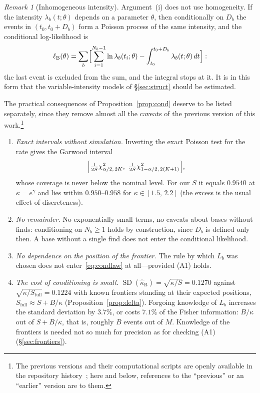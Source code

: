 \documentclass[11pt,a4paper]{article}
\theoremstyle{plain}
\theoremstyle{remark}
\newtheorem{remark}{Remark}
\newcommand{\eg}{e^{\gamma}}
\begin{document}
\begin{remark}[Inhomogeneous intensity]\label{rem:inhom}
Argument~(i) does not use homogeneity. If the intensity $\lambda_b(t;\theta)$
depends on a parameter $\theta$, then conditionally on $D_b$ the events in
$(t_0,t_0+D_b)$ form a Poisson process of the same intensity, and the
conditional log-likelihood is
\begin{equation}\label{eq:condinhom}
\ell_{\mathrm B}(\theta)=\sum_b\Bigl[\sum_{i=1}^{N_b-1}\ln\lambda_b(t_i;\theta)
-\int_{t_0}^{t_0+D_b}\lambda_b(t;\theta)\,dt\Bigr]:
\end{equation}
the last event is excluded from the sum, and the integral stops at it. It is in
this form that the variable-intensity models of \S\ref{sec:struct} should be
estimated.
\end{remark}

The practical consequences of Proposition~\ref{prop:cond} deserve to be listed
separately, since they remove almost all the caveats of the previous version of
this work.\footnote{The previous versions and their computational scripts are
openly available in the repository history~\cite{repunithunt}; here and below,
references to the ``previous'' or an ``earlier'' version are to them.}

\begin{enumerate}
\item \emph{Exact intervals without simulation.} Inverting the exact Poisson
test for the rate gives the Garwood interval~\cite{garwood1936}
\begin{equation}\label{eq:garwood}
\Bigl[\tfrac{1}{2S}\chi^2_{\alpha/2,\,2K},\ \tfrac{1}{2S}\chi^2_{1-\alpha/2,\,2(K+1)}\Bigr],
\end{equation}
whose coverage is never below the nominal level. For our $S$ it equals $0.9540$ at
$\kappa=\eg$ and lies within $0.950$--$0.958$ for $\kappa\in[1.5,\,2.2]$ (the
excess is the usual effect of discreteness).
\item \emph{No remainder.} No exponentially small terms, no caveats about bases
without finds: conditioning on $N_b\ge1$ holds by construction, since $D_b$ is
defined only then. A base without a single find does not enter the conditional
likelihood.
\item \emph{No dependence on the position of the frontier.} The rule by which
$L_b$ was chosen does not enter~\eqref{eq:condlaw} at all---provided (A1) holds.
\item \emph{The cost of conditioning is small.} $\operatorname{SD}(\hat\kappa_{\mathrm B})
=\sqrt{\kappa/S}=0.1270$ against $\sqrt{\kappa/S_{\mathrm{full}}}=0.1224$ with
known frontiers standing at their expected positions,
$S_{\mathrm{full}}\approx S+B/\kappa$ (Proposition~\ref{prop:delta}). Forgoing
knowledge of $L_b$ increases the standard deviation by $3.7\%$, or costs $7.1\%$ of
the Fisher information: $B/\kappa$ out of $S+B/\kappa$, that is, roughly $B$ events
out of $M$. Knowledge of the frontiers is needed not so much for precision as for
checking (A1) (\S\ref{sec:frontiers}).
\end{enumerate}
\end{document}
